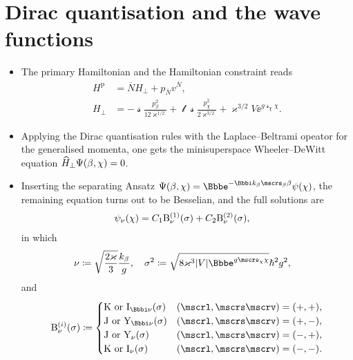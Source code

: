 \documentclass[9pt]{beamer}
\begin{document}
\section{Dirac quantisation and the wave functions}

\begin{itemize}
\item
The primary Hamiltonian and the Hamiltonian constraint reads
\begin{align}
H^\text{p} &= \overline{N}H_\perp + p_{\overline{N}} v^{\overline{N}},
\\
H_\perp &= -\mscrs\frac{p_\beta^2}{12\varkappa^{1/2}}
+\mscrl\mscrs\frac{p_\chi^2}{2\varkappa^{3/2}}
+\varkappa^{3/2}V\ee^{g\mscrs_\chi\chi}.
\end{align}
\item
Applying the Dirac quantisation rules with the Laplace--Beltrami opeator for
the generalised momenta, one gets the minisuperspace Wheeler--DeWitt
equation $\widehat{H}_\perp {\Psi}\mathopen{}\left(\beta,\chi\right)\mathclose{} = 0$.

\item
Inserting the separating Ansatz $\rfun{\Psi}{\beta,\chi} =
\ee^{-\ii k_\beta\mscrs_\beta\beta}\rfun{\psi}{\chi}$, the remaining
equation turns out to be Besselian, and the full solutions are
\begin{align}
{\psi_\nu}\mathopen{}\left(\chi\right)\mathclose{} &= 
C_1{\mathrm{B}_{\nu}^{(1)}}\mathopen{}\left(\sigma\right)\mathclose{}
+C_2{\mathrm{B}_{\nu}^{(2)}}\mathopen{}\left(\sigma\right)\mathclose{},
\end{align}
in which
\begin{align}
\nu &\coloneqq \sqrt{\frac{2\varkappa}{3}}\frac{k_\beta}{g},\quad
\sigma^2 \coloneqq 
\sqrt{8\varkappa^3\vbr{V}\ee^{g\mscrs_\chi\chi}}{\hslash^2 g^2},
\label{eq:trsf-quantum-sigma}
\end{align}
and
\begin{align}
\rfun{\mathrm{B}^{(i)}_{\nu}}{\sigma} \coloneqq
\begin{cases}
\mathrm{K}\text{ or }\rfun{\mathrm{I}_{\ii\nu}}{\sigma}
& \rbr{\mscrl, \mscrs\mscrv} = \rbr{+,+}, \\
\mathrm{J}\text{ or }\rfun{\mathrm{Y}_{\ii\nu}}{\sigma}
& \rbr{\mscrl, \mscrs\mscrv} = \rbr{+,-}, \\
\mathrm{J}\text{ or }\rfun{\mathrm{Y}_{\nu}}{\sigma}
& \rbr{\mscrl, \mscrs\mscrv} = \rbr{-,+}, \\
\mathrm{K}\text{ or }\rfun{\mathrm{I}_{\nu}}{\sigma}
& \rbr{\mscrl, \mscrs\mscrv} = \rbr{-,-}. \\
\end{cases}
\end{align}
\end{itemize}
\end{document}
